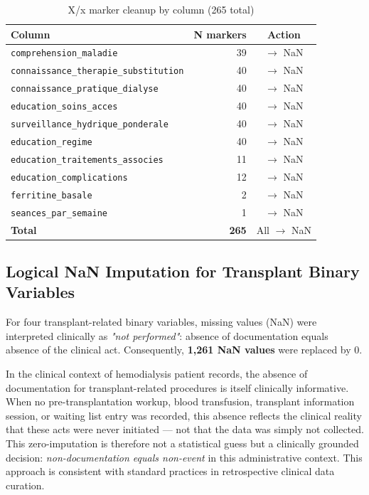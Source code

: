 \documentclass[12pt,a4paper,twoside]{report}
\begin{document}
\begin{table}[htbp]
\centering
\caption{X/x marker cleanup by column (265 total)}
\label{tab:xmarkers}
\begin{tabular}{p{6.5cm}rc}
\toprule
\textbf{Column} & \textbf{N markers} & \textbf{Action} \\
\midrule
\texttt{comprehension\_maladie} & 39 & $\rightarrow$ NaN \\
\texttt{connaissance\_therapie\_substitution} & 40 & $\rightarrow$ NaN \\
\texttt{connaissance\_pratique\_dialyse} & 40 & $\rightarrow$ NaN \\
\texttt{education\_soins\_acces} & 40 & $\rightarrow$ NaN \\
\texttt{surveillance\_hydrique\_ponderale} & 40 & $\rightarrow$ NaN \\
\texttt{education\_regime} & 40 & $\rightarrow$ NaN \\
\texttt{education\_traitements\_associes} & 11 & $\rightarrow$ NaN \\
\texttt{education\_complications} & 12 & $\rightarrow$ NaN \\
\texttt{ferritine\_basale} & 2 & $\rightarrow$ NaN \\
\texttt{seances\_par\_semaine} & 1 & $\rightarrow$ NaN \\
\midrule
\textbf{Total} & \textbf{265} & All $\rightarrow$ NaN \\
\bottomrule
\end{tabular}
\end{table}

\subsection{Logical NaN Imputation for Transplant Binary Variables}

For four transplant-related binary variables, missing values (NaN) were interpreted clinically as \textit{"not performed"}: absence of documentation equals absence of the clinical act. Consequently, \textbf{1,261 NaN values} were replaced by 0.

In the clinical context of hemodialysis patient records, the absence of documentation for transplant-related procedures is itself clinically informative. When no pre-transplantation workup, blood transfusion, transplant information session, or waiting list entry was recorded, this absence reflects the clinical reality that these acts were never initiated — not that the data was simply not collected. This zero-imputation is therefore not a statistical guess but a clinically grounded decision: \textit{non-documentation equals non-event} in this administrative context. This approach is consistent with standard practices in retrospective clinical data curation.
\end{document}
